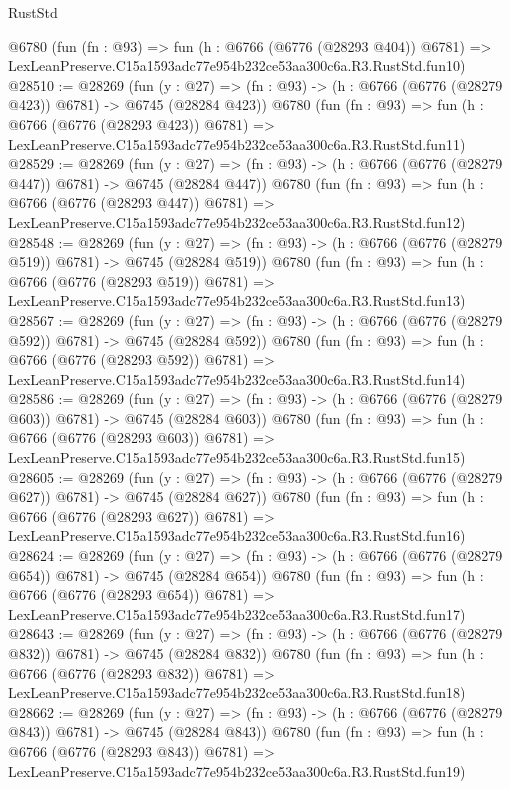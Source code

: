 \begin{lexlean}{RustStd}
\begin{coremodule}
    @6780
    (fun (fn : @93) =>
    fun (h : @6766 (@6776 (@28293 @404)) @6781) =>
    LexLeanPreserve.C15a1593adc77e954b232ce53aa300c6a.R3.RustStd.fun10)
@28510 := @28269
    (fun (y : @27) => (fn : @93) -> (h : @6766 (@6776 (@28279 @423)) @6781) -> @6745 (@28284 @423))
    @6780
    (fun (fn : @93) =>
    fun (h : @6766 (@6776 (@28293 @423)) @6781) =>
    LexLeanPreserve.C15a1593adc77e954b232ce53aa300c6a.R3.RustStd.fun11)
@28529 := @28269
    (fun (y : @27) => (fn : @93) -> (h : @6766 (@6776 (@28279 @447)) @6781) -> @6745 (@28284 @447))
    @6780
    (fun (fn : @93) =>
    fun (h : @6766 (@6776 (@28293 @447)) @6781) =>
    LexLeanPreserve.C15a1593adc77e954b232ce53aa300c6a.R3.RustStd.fun12)
@28548 := @28269
    (fun (y : @27) => (fn : @93) -> (h : @6766 (@6776 (@28279 @519)) @6781) -> @6745 (@28284 @519))
    @6780
    (fun (fn : @93) =>
    fun (h : @6766 (@6776 (@28293 @519)) @6781) =>
    LexLeanPreserve.C15a1593adc77e954b232ce53aa300c6a.R3.RustStd.fun13)
@28567 := @28269
    (fun (y : @27) => (fn : @93) -> (h : @6766 (@6776 (@28279 @592)) @6781) -> @6745 (@28284 @592))
    @6780
    (fun (fn : @93) =>
    fun (h : @6766 (@6776 (@28293 @592)) @6781) =>
    LexLeanPreserve.C15a1593adc77e954b232ce53aa300c6a.R3.RustStd.fun14)
@28586 := @28269
    (fun (y : @27) => (fn : @93) -> (h : @6766 (@6776 (@28279 @603)) @6781) -> @6745 (@28284 @603))
    @6780
    (fun (fn : @93) =>
    fun (h : @6766 (@6776 (@28293 @603)) @6781) =>
    LexLeanPreserve.C15a1593adc77e954b232ce53aa300c6a.R3.RustStd.fun15)
@28605 := @28269
    (fun (y : @27) => (fn : @93) -> (h : @6766 (@6776 (@28279 @627)) @6781) -> @6745 (@28284 @627))
    @6780
    (fun (fn : @93) =>
    fun (h : @6766 (@6776 (@28293 @627)) @6781) =>
    LexLeanPreserve.C15a1593adc77e954b232ce53aa300c6a.R3.RustStd.fun16)
@28624 := @28269
    (fun (y : @27) => (fn : @93) -> (h : @6766 (@6776 (@28279 @654)) @6781) -> @6745 (@28284 @654))
    @6780
    (fun (fn : @93) =>
    fun (h : @6766 (@6776 (@28293 @654)) @6781) =>
    LexLeanPreserve.C15a1593adc77e954b232ce53aa300c6a.R3.RustStd.fun17)
@28643 := @28269
    (fun (y : @27) => (fn : @93) -> (h : @6766 (@6776 (@28279 @832)) @6781) -> @6745 (@28284 @832))
    @6780
    (fun (fn : @93) =>
    fun (h : @6766 (@6776 (@28293 @832)) @6781) =>
    LexLeanPreserve.C15a1593adc77e954b232ce53aa300c6a.R3.RustStd.fun18)
@28662 := @28269
    (fun (y : @27) => (fn : @93) -> (h : @6766 (@6776 (@28279 @843)) @6781) -> @6745 (@28284 @843))
    @6780
    (fun (fn : @93) =>
    fun (h : @6766 (@6776 (@28293 @843)) @6781) =>
    LexLeanPreserve.C15a1593adc77e954b232ce53aa300c6a.R3.RustStd.fun19)

\end{coremodule}
\end{lexlean}
